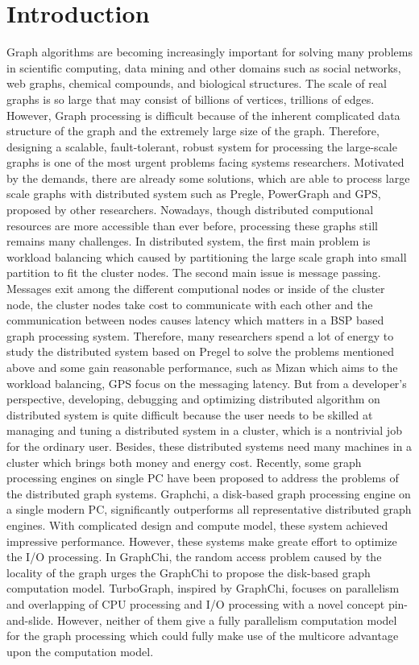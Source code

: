 \documentclass[twocolumn,a4paper,10pt]{article}
\begin{document}
\section{Introduction}
Graph algorithms are becoming increasingly important for solving many problems in scientific computing, data mining and other domains such as social networks, web graphs, chemical compounds, and biological structures. The scale of real graphs is so large that may consist of billions of vertices, trillions of edges. However, Graph processing is difficult because of the inherent complicated data structure of the graph and the extremely large size of the graph. Therefore, designing a scalable, fault-tolerant, robust system for processing the large-scale graphs is one of the most urgent problems facing systems researchers.\newline
Motivated by the demands, there are already some solutions, which are able to process large scale graphs with distributed system such as Pregle, PowerGraph and GPS, proposed by other researchers. Nowadays, though distributed computional resources are more accessible than ever before, processing these graphs still remains many challenges. In distributed system, the first main problem is workload balancing which caused by partitioning the large scale graph into small partition to fit the cluster nodes. The second main issue is message passing. Messages exit among the different computional nodes or inside of the cluster node, the cluster nodes take cost to communicate with each other and the communication between nodes causes latency which matters in a BSP based graph processing system. Therefore, many researchers spend a lot of energy to study the distributed system based on Pregel to solve the problems mentioned above and some gain reasonable performance, such as Mizan which aims to the workload balancing, GPS focus on the messaging latency. But from a developer’s perspective, developing, debugging and optimizing distributed algorithm on distributed system is quite difficult because the user needs to be skilled at managing and tuning a distributed system in a cluster, which is a nontrivial job for the ordinary user. Besides, these distributed systems need many machines in a cluster which brings both money and energy cost.  \newline
Recently, some graph processing engines on single PC have been proposed to address the problems of the distributed graph systems. Graphchi, a disk-based graph processing engine on a single modern PC, significantly outperforms all representative distributed graph engines.  With complicated design and compute model, these system achieved impressive performance. However, these systems make greate effort to optimize the I/O processing. In GraphChi, the random access problem caused by the locality of the graph urges the GraphChi to propose the disk-based graph computation model. TurboGraph, inspired by GraphChi, focuses on parallelism and overlapping of CPU processing and I/O processing with a novel concept pin-and-slide.  However, neither of them give a fully parallelism computation model for the graph processing which could fully make use of the multicore advantage upon the computation model.
\end{document}
